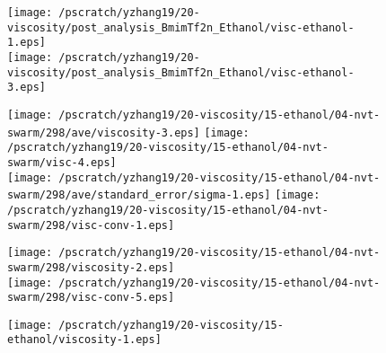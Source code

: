 \documentclass[12pt]{article}
\begin{document}
\newpage
\clearpage
\begin{figure}
\begin{center}
\texttt{[image: /pscratch/yzhang19/20-viscosity/post\_analysis\_BmimTf2n\_Ethanol/visc-ethanol-1.eps]}
\\
\texttt{[image: /pscratch/yzhang19/20-viscosity/post\_analysis\_BmimTf2n\_Ethanol/visc-ethanol-3.eps]}
\caption{}
\label{fig:ethanol-visc}
\end{center}
\end{figure}



\newpage
\clearpage
\begin{figure}
\begin{center}
\texttt{[image: /pscratch/yzhang19/20-viscosity/15-ethanol/04-nvt-swarm/298/ave/viscosity-3.eps]}
\vspace{0.2in}
\texttt{[image: /pscratch/yzhang19/20-viscosity/15-ethanol/04-nvt-swarm/visc-4.eps]}
\\
\texttt{[image: /pscratch/yzhang19/20-viscosity/15-ethanol/04-nvt-swarm/298/ave/standard\_error/sigma-1.eps]}
\vspace{0.2in}
\texttt{[image: /pscratch/yzhang19/20-viscosity/15-ethanol/04-nvt-swarm/298/visc-conv-1.eps]}
\caption{}
\label{fig:ethanol-num}
\end{center}
\end{figure}


\newpage
\clearpage
\begin{figure}
\begin{center}
\texttt{[image: /pscratch/yzhang19/20-viscosity/15-ethanol/04-nvt-swarm/298/viscosity-2.eps]}
\\
\texttt{[image: /pscratch/yzhang19/20-viscosity/15-ethanol/04-nvt-swarm/298/visc-conv-5.eps]}
\caption{}
\label{fig:ethanol-length}
\end{center}
\end{figure}

\newpage
\clearpage
\begin{figure}
\begin{center}
\texttt{[image: /pscratch/yzhang19/20-viscosity/15-ethanol/viscosity-1.eps]}
\caption{}
\label{fig:ethanol-boxsize}
\end{center}
\end{figure}


\end{document}
